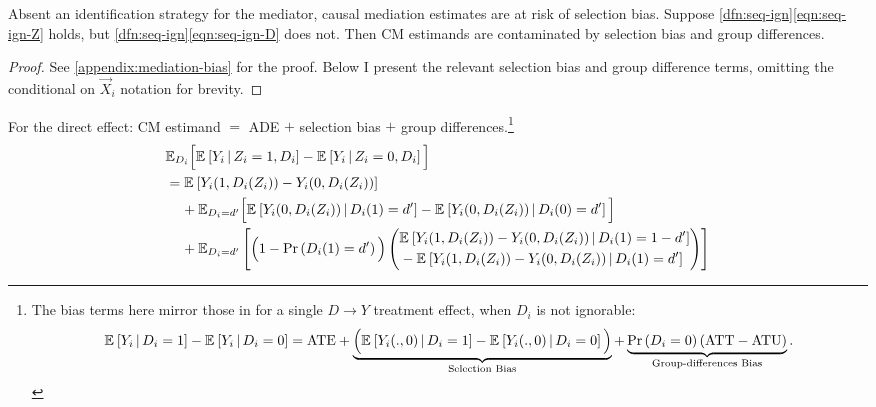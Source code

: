\begin{theorem}
    \label{thm:selection-bias}
    Absent an identification strategy for the mediator, causal mediation estimates are at risk of selection bias.
    Suppose \ref{dfn:seq-ign}\eqref{eqn:seq-ign-Z} holds, but \ref{dfn:seq-ign}\eqref{eqn:seq-ign-D} does not.
    Then CM estimands are contaminated by selection bias and group differences.
\end{theorem}
\begin{proof}
    See \autoref{appendix:mediation-bias} for the proof.
    Below I present the relevant selection bias and group difference terms, omitting the conditional on $\vec X_i$ notation for brevity.
\end{proof}

\noindent
For the direct effect: CM estimand $=$ ADE $+$ selection bias $+$ group differences.\footnote{
    The bias terms here mirror those in \cite{heckman1998characterizing,angrist2009mostly} for a single $D\to Y$ treatment effect, when $D_i$ is not ignorable:
    \vspace{-0.25cm}
    \[ \Egiven{ Y_i}{D_i =1} - \Egiven{ Y_i}{D_i =0}
        = \text{ATE}
        + \underbrace{\Big( \Egiven{ Y_i(.,0)}{D_i =1} - \Egiven{ Y_i(.,0)}{D_i =0} \Big)}_{
            \text{Selection Bias}}
        + \underbrace{ \Prob{D_i=0} (\text{ATT} - \text{ATU}) }_{
            \text{Group-differences Bias}}. \]
}
\begin{align*}
    & \mathbb E_{D_i} \Big[
        \Egiven{Y_i}{Z_i = 1, D_i} - \Egiven{Y_i}{Z_i = 0, D_i} \Big] \\
    & = \E{Y_i(1, D_i(Z_i)) - Y_i(0, D_i(Z_i))} \\
    & \;\;\;\; + \mathbb E_{D_i = d'} \Big[
        \Egiven{Y_i(0, D_i(Z_i))}{D_i(1) = d'} 
        - \Egiven{Y_i(0, D_i(Z_i))}{D_i(0) = d'} \Big] \\
    & \;\;\;\; + \E[D_i = d']{
        \Big(1 - \Prob{D_i(1) = d'} \Big)
        \left( \begin{aligned}
            &\Egiven{Y_i(1, D_i(Z_i)) - Y_i(0, D_i(Z_i))}{D_i(1) = 1-d'} \\ 
            &  - \Egiven{Y_i(1, D_i(Z_i)) - Y_i(0, D_i(Z_i))}{D_i(1) = d'}
            \end{aligned} \right) }
\end{align*}

